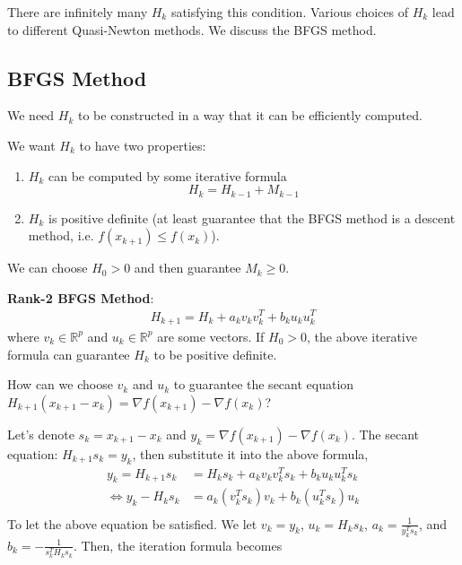 \documentclass[11pt]{elegantbook}
\begin{document}
There are infinitely many $H_k$ satisfying this condition. Various choices of $H_k$ lead to different Quasi-Newton methods. We discuss the BFGS method.

\subsection{BFGS Method}
We need $H_k$ to be constructed in a way that it can be efficiently computed.

We want $H_k$ to have two properties:
\begin{enumerate}[$(1)$]
    \item $H_k$ can be computed by some iterative formula $$H_k=H_{k-1}+M_{k-1}$$
    \item $H_k$ is positive definite (at least guarantee that the BFGS method is a descent method, i.e. $f(x_{k+1})\leq f(x_k)$).
\end{enumerate}
We can choose $H_0>0$ and then guarantee $M_k\geq 0$.

\textbf{Rank-2 BFGS Method}:
\begin{equation}
    \begin{aligned}
        H_{k+1}=H_k+a_kv_kv_k^T+b_ku_ku_k^T
    \end{aligned}
    \nonumber
\end{equation}
where $v_k\in \mathbb{R}^p$ and $u_k\in \mathbb{R}^p$ are some vectors. If $H_0>0$, the above iterative formula can guarantee $H_k$ to be positive definite.

How can we choose $v_k$ and $u_k$ to guarantee the secant equation $H_{k+1}(x_{k+1}-x_{k})=\nabla f(x_{k+1})-\nabla f(x_{k})$?

Let's denote $s_k=x_{k+1}-x_k$ and $y_k=\nabla f(x_{k+1})-\nabla f(x_k)$. The secant equation: $H_{k+1}s_k=y_k$, then substitute it into the above formula,
\begin{equation}
    \begin{aligned}
        y_{k}=H_{k+1}s_k&=H_ks_k+a_k v_k v_k^T s_k+b_ku_ku_k^Ts_k\\
        \Leftrightarrow y_{k}-H_ks_k&=a_k (v_k^T s_k)v_k+b_k(u_k^Ts_k)u_k\\
    \end{aligned}
    \nonumber
\end{equation}
To let the above equation be satisfied. We let $v_k=y_k$, $u_k=H_k s_k$, $a_k=\frac{1}{y_k^T s_k}$, and $b_k=-\frac{1}{s_k^TH_ks_k}$. Then, the iteration formula becomes
\begin{center}
\end{center}
\end{document}
